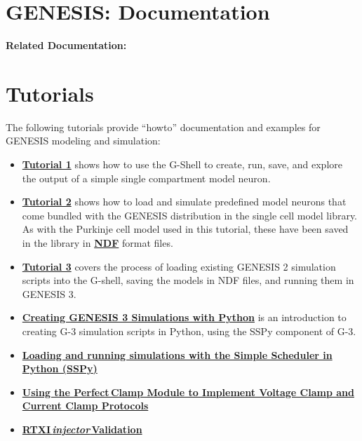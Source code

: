 \documentclass[12pt]{article}
\begin{document}
\section*{GENESIS: Documentation}

{\bf Related Documentation:}

\section*{Tutorials}

The following tutorials provide ``howto'' documentation and examples for
GENESIS modeling and simulation:

\begin{itemize}

   \item[]\href{../tutorial1/tutorial1.html}
          {\bf Tutorial 1} shows how to use the G-Shell to create, run,
          save, and explore the output of a simple single compartment model neuron.

   \item[]\href{../tutorial2/tutorial2.html}
          {\bf Tutorial 2} shows how to load and simulate predefined model
    neurons that come bundled with the GENESIS distribution in the single
    cell model library. As with the Purkinje cell model used in this
    tutorial, these have been saved in the library in
    \href{../ndf-file-format/ndf-file-format.tex}{\bf NDF} format files.

   \item[]\href{../tutorial3/tutorial3.html}
          {\bf Tutorial 3} covers the process of loading existing GENESIS 2
   simulation scripts into the G-shell, saving the models in NDF files, and
   running them in GENESIS 3. 

   \item[]\href{../tutorial-python-scripting/tutorial-python-scripting.html}
          {\bf Creating GENESIS 3 Simulations with Python}
    is an introduction to creating G-3 simulation
    scripts in Python, using the SSPy component of G-3.

   \item[]\href{../sspy/sspy.tex}{\bf Loading and running simulations with the
 Simple Scheduler in Python (SSPy)}

   \item[]\href{../pclamp/pclamp.tex}{\bf Using the Perfect\,Clamp Module to Implement Voltage Clamp and Current Clamp Protocols}
   \item[]\href{../rtxi-injector-validation/rtxi-injector-validation.tex}{\bf RTXI\,{\it injector}\,Validation}
\end{itemize}
\end{document}
